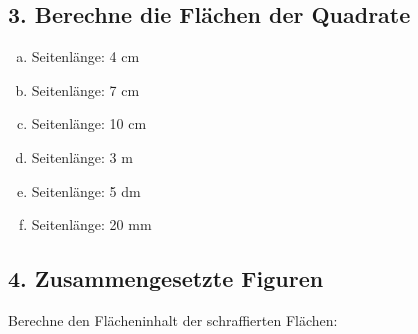 \vspace{0.5em}

\subsection*{3. Berechne die Flächen der Quadrate}

\begin{multicols}{2}
\begin{enumerate}[a)]
    \item Seitenlänge: 4 cm
    \item Seitenlänge: 7 cm
    \item Seitenlänge: 10 cm
    \item Seitenlänge: 3 m
    \item Seitenlänge: 5 dm
    \item Seitenlänge: 20 mm
\end{enumerate}
\end{multicols}

\vspace{0.5em}

\subsection*{4. Zusammengesetzte Figuren}

Berechne den Flächeninhalt der schraffierten Flächen:

